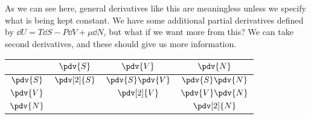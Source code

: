 \documentclass[a4paper,twoside,master.tex]{subfiles}
\begin{document}
As we can see here, general derivatives like this are meaningless unless we specify what is being kept constant. We have some additional partial derivatives defined by $ \dd{U} = T \dd{S} - P \dd{V} + \mu \dd{N} $, but what if we want more from this? We can take second derivatives, and these should give us more information.
\begin{center}
\begin{tabular}{@{}c|ccc@{}}
    & $ \pdv{S} $ & $ \pdv{V} $ & $ \pdv{N} $ \\
    \toprule
    $ \pdv{S} $ & $ \pdv[2]{S} $ & $ \pdv{S} \pdv{V} $ & $ \pdv{S} \pdv{N} $ \\
    $ \pdv{V} $ & & $ \pdv[2]{V} $ & $ \pdv{V} \pdv{N} $ \\
    $ \pdv{N} $ & & & $ \pdv[2]{N} $
\end{tabular}
\end{center}
\end{document}
